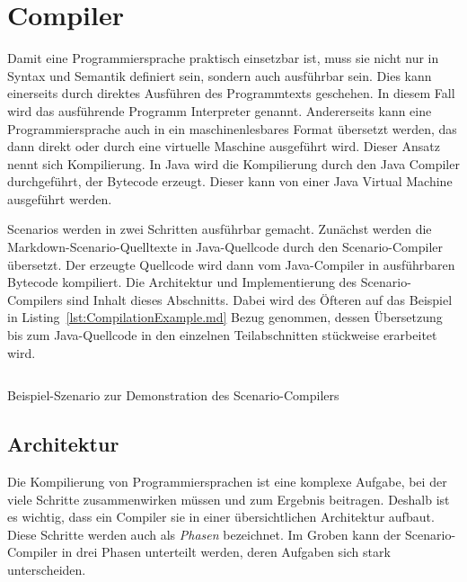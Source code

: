 \section{Compiler}\label{sec:compiler}

Damit eine Programmiersprache praktisch einsetzbar ist, muss sie nicht nur in Syntax und Semantik definiert sein, sondern auch ausführbar sein.
Dies kann einerseits durch direktes Ausführen des Programmtexts geschehen.
In diesem Fall wird das ausführende Programm Interpreter genannt.
Andererseits kann eine Programmiersprache auch in ein maschinenlesbares Format übersetzt werden, das dann direkt oder durch eine virtuelle Maschine ausgeführt wird.
Dieser Ansatz nennt sich Kompilierung.
In Java wird die Kompilierung durch den Java Compiler durchgeführt, der Bytecode erzeugt.
Dieser kann von einer Java Virtual Machine ausgeführt werden.

Scenarios werden in zwei Schritten ausführbar gemacht.
Zunächst werden die Markdown-Scenario-Quelltexte in Java-Quellcode durch den Scenario-Compiler übersetzt.
Der erzeugte Quellcode wird dann vom Java-Compiler in ausführbaren Bytecode kompiliert.
Die Architektur und Implementierung des Scenario-Compilers sind Inhalt dieses Abschnitts.
Dabei wird des Öfteren auf das Beispiel in Listing~\ref{lst:CompilationExample.md} Bezug genommen, dessen Übersetzung bis zum Java-Quellcode in den einzelnen Teilabschnitten stückweise erarbeitet wird.

\begin{listing}[htp]
    \centering
    \inputminted{md}{chapter/fulib-scenarios/scenarios/CompilationExample.md}
    \vspace{-3ex}
    \caption{Beispiel-Szenario zur Demonstration des Scenario-Compilers}
    \label{lst:CompilationExample.md}
\end{listing}

\subsection{Architektur}\label{subsec:compiler-architecture}

Die Kompilierung von Programmiersprachen ist eine komplexe Aufgabe, bei der viele Schritte zusammenwirken müssen und zum Ergebnis beitragen.
Deshalb ist es wichtig, dass ein Compiler sie in einer übersichtlichen Architektur aufbaut.
Diese Schritte werden auch als \emph{Phasen}\cite[S.~4]{dragonbook} bezeichnet.
Im Groben kann der Scenario-Compiler in drei Phasen unterteilt werden, deren Aufgaben sich stark unterscheiden.

